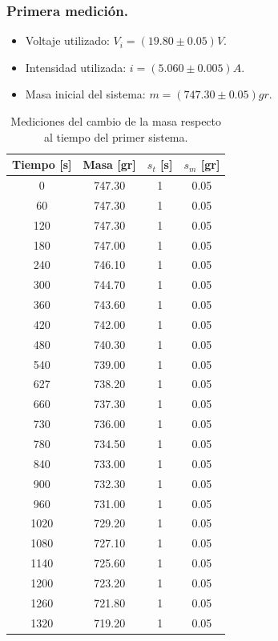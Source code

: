 \documentclass[a4paper]{article}
\begin{document}
\subsubsection*{Primera medición.}
\begin{itemize}
    \item Voltaje utilizado: $V_i = (19.80\pm0.05)V$.
    \item Intensidad utilizada: $i = (5.060\pm0.005)A$.
    \item Masa inicial del sistema: $m = (747.30\pm0.05)gr$.
\end{itemize}
\begin{table}[H]
  \centering
    \begin{tabular}{|c|c|c|c|} \hline
    \multicolumn{1}{|l|}{Tiempo [s]} & \multicolumn{1}{|l|}{Masa [gr]} & \multicolumn{1}{|l|}{$s_t$ [s]} & \multicolumn{1}{|l|}{$s_m$ [gr]} \\ \hline
    0     & 747.30 & 1     & 0.05 \\ \hline
    60    & 747.30 & 1     & 0.05 \\ \hline
    120   & 747.30 & 1     & 0.05 \\ \hline
    180   & 747.00 & 1     & 0.05 \\ \hline
    240   & 746.10 & 1     & 0.05 \\ \hline
    300   & 744.70 & 1     & 0.05 \\ \hline
    360   & 743.60 & 1     & 0.05 \\ \hline
    420   & 742.00 & 1     & 0.05 \\ \hline
    480   & 740.30 & 1     & 0.05 \\ \hline
    540   & 739.00 & 1     & 0.05 \\ \hline
    627   & 738.20 & 1     & 0.05 \\ \hline
    660   & 737.30 & 1     & 0.05 \\ \hline
    730   & 736.00 & 1     & 0.05 \\ \hline
    780   & 734.50 & 1     & 0.05 \\ \hline
    840   & 733.00 & 1     & 0.05 \\ \hline
    900   & 732.30 & 1     & 0.05 \\ \hline
    960   & 731.00 & 1     & 0.05 \\ \hline
    1020  & 729.20 & 1     & 0.05 \\ \hline
    1080  & 727.10 & 1     & 0.05 \\ \hline
    1140  & 725.60 & 1     & 0.05 \\ \hline
    1200  & 723.20 & 1     & 0.05 \\ \hline
    1260  & 721.80 & 1     & 0.05 \\ \hline
    1320  & 719.20 & 1     & 0.05 \\ \hline
    \end{tabular}%
  \caption{Mediciones del cambio de la masa respecto al tiempo del primer sistema.}
\end{table}%
\end{document}
